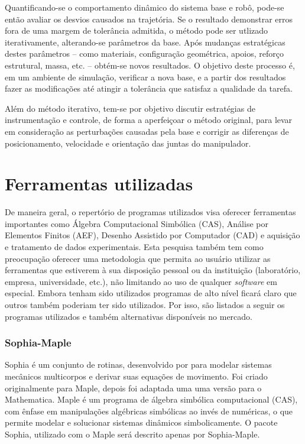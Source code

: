 Quantificando-se o comportamento dinâmico do sistema base e robô, pode-se então
avaliar os desvios causados na trajetória. Se o resultado demonstrar erros fora
de uma margem de tolerância admitida, o método pode ser utlizado iterativamente,
alterando-se parâmetros da base.
Após mudanças estratégicas destes parâmetros -- como materiais, configuração
geométrica, apoios, reforço estrutural, massa, etc. -- obtém-se novos
resultados.
O objetivo deste processo é, em um ambiente de simulação, verificar a nova base,
e a partir dos resultados fazer as modificações até atingir a tolerância que
satisfaz a qualidade da tarefa.

Além do método iterativo, tem-se por objetivo discutir estratégias de
instrumentação e controle, de forma a aperfeiçoar o método original, para levar
em consideração as perturbações causadas pela base e corrigir as diferenças de
posicionamento, velocidade e orientação das juntas do manipulador.


\section{Ferramentas utilizadas}

De maneira geral, o repertório de programas utilizados visa oferecer ferramentas
importantes como Álgebra Computacional Simbólica (CAS), Análise por Elementos
Finitos (AEF), Desenho Assistido por Computador (CAD) e aquisição e tratamento
de dados experimentais. Esta pesquisa também tem como preocupação oferecer uma
metodologia que permita ao usuário utilizar as ferramentas que estiverem à sua
disposição pessoal ou da instituição (laboratório, empresa, universidade, etc.),
não limitando ao uso de qualquer \textit{software} em especial. Embora tenham
sido utilizados programas de alto nível ficará claro que outros também poderiam
ter sido utilizados. Por isso, são listados a seguir os programas utilizados e
também alternativas disponíveis no mercado.

\subsubsection{Sophia-Maple}

Sophia é um conjunto de rotinas, desenvolvido por \citet{lesser1995analysis}
para modelar sistemas mecânicos multicorpos e derivar suas equações de
movimento. Foi criado originalmente para Maple, depois foi adaptada uma uma
versão para o Mathematica.
Maple\cite{maple} é um programa de álgebra simbólica computacional (CAS), com
ênfase em manipulações algébricas simbólicas ao invés de numéricas, o que
permite modelar e solucionar sistemas dinâmicos simbolicamente. O pacote Sophia,
utilizado com o Maple será descrito apenas por Sophia-Maple.

